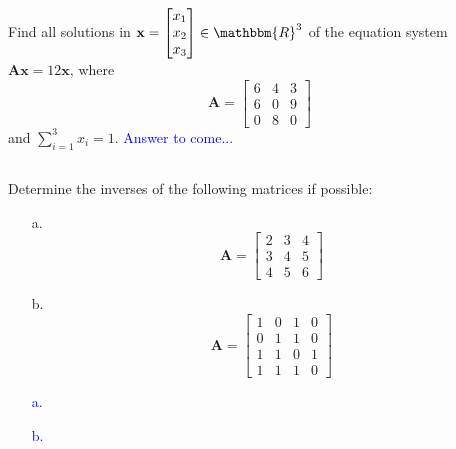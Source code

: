 \documentclass[a4paper,12pt]{article}
\newcommand{\R}{\mathbbm{R}}
\newcommand{\M}[1]{ \begin{bmatrix} #1 \end{bmatrix} }
\newcommand{\vecx}{\textbf{x}}
\newcommand{\matA}{\textbf{A}}
\begin{document}
\subsection{}
Find all solutions in $\vecx = \M{x_1\\x_2\\x_3} \in \R^3$ of the equation system $\matA \vecx = 12 \vecx$, where 
$$\matA = \M{6&4&3\\6&0&9\\0&8&0}$$
and $\sum_{i=1}^3 x_i = 1$.
\textcolor{blue}{
Answer to come...
}
\subsection{}
Determine the inverses of the following matrices if possible:
\begin{itemize}
 \item [a.] $$\matA = \M{2&3&4\\3&4&5\\4&5&6}$$
 \item [b.] $$\matA = \M{1&0&1&0\\0&1&1&0\\1&1&0&1\\1&1&1&0}$$
\end{itemize}
\textcolor{blue}{
\begin{itemize}
 \item [a.] 
 \item [b.] 
\end{itemize}
}
\end{document}

